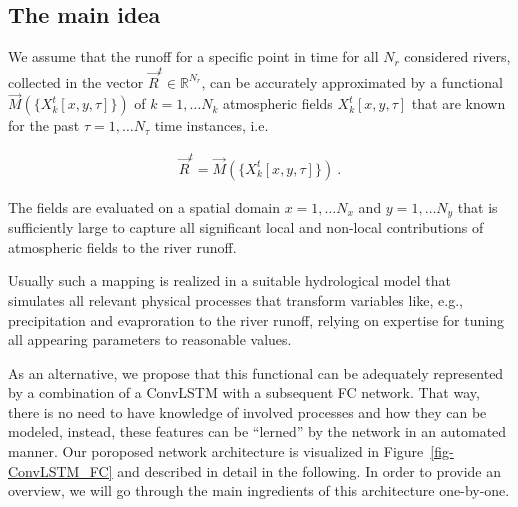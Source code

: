 \documentclass[
]{agujournal2019}
\begin{document}
\subsection{The main idea}\label{sec-main_idea}

We assume that the runoff for a specific point in time for all \(N_r\)
considered rivers, collected in the vector
\(\vec{R}^t \in \mathbb{R}^{N_r}\), can be accurately approximated by a
functional \(\vec{M}(\{X^t_k[x,y,\tau]\})\) of \(k=1,\ldots N_k\)
atmospheric fields \(X^t_k[x,y,\tau]\) that are known for the past
\(\tau=1,\ldots N_\tau\) time instances, i.e.

\[
\begin{aligned}
\vec{R}^t = \vec{M}(\{X^t_k[x,y,\tau]\}) \ .
\end{aligned}
\]

The fields are evaluated on a spatial domain \(x=1,\ldots N_x\) and
\(y=1,\ldots N_y\) that is sufficiently large to capture all significant
local and non-local contributions of atmospheric fields to the river
runoff.

Usually such a mapping is realized in a suitable hydrological model that
simulates all relevant physical processes that transform variables like,
e.g., precipitation and evaproration to the river runoff, relying on
expertise for tuning all appearing parameters to reasonable values.

As an alternative, we propose that this functional can be adequately
represented by a combination of a ConvLSTM with a subsequent FC network.
That way, there is no need to have knowledge of involved processes and
how they can be modeled, instead, these features can be ``lerned'' by
the network in an automated manner. Our poroposed network architecture
is visualized in Figure~\ref{fig-ConvLSTM_FC} and described in detail in
the following. In order to provide an overview, we will go through the
main ingredients of this architecture one-by-one.
\end{document}
